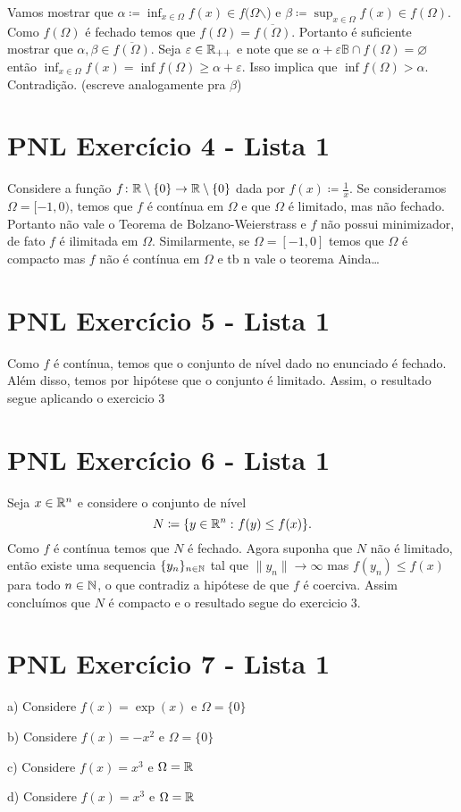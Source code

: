 \documentclass[12pt,twoside,a4paper]{book}
\begin{document}
Vamos mostrar que \(\alpha\coloneqq\inf_{x\in\Omega}f(x)\in f(\Omega\)$\backslash$) e \(\beta\coloneqq\sup_{x\in\Omega}f(x)\in f(\Omega)\).
Como \(f(\Omega)\) é fechado temos que \(f(\Omega)=\overline{f(\Omega)}\). Portanto é suficiente mostrar que 
\(\alpha,\beta\in\overline{f(\Omega)}\). Seja \(\varepsilon\in\mathbb{R}_{++}\) e note que se \(\alpha +\varepsilon\mathbb{B}\cap f(\Omega)=\varnothing\) então \(\inf_{x\in\Omega}f(x)=\inf f(\Omega)\geq\alpha+\varepsilon\).
Isso implica que \(\inf f(\Omega) > \alpha\). Contradição. (escreve analogamente pra \(\beta\))


\section{PNL Exercício 4 - Lista 1}
\label{sec:org026ff9d}

Considere a função \(f\colon\mathbb{R}\setminus\{0\}\to\mathbb{R}\setminus\{0\}\) dada por \(f(x)\coloneqq\frac{1}{x}\). Se consideramos
\(\Omega=[-1,0)\), temos que \(f\) é contínua em \(\Omega\) e que \(\Omega\) é limitado, mas não fechado.
Portanto não vale o Teorema de Bolzano-Weierstrass e \(f\) não possui minimizador, de fato \(f\) é ilimitada em \(\Omega\).
Similarmente, se \(\Omega=[-1,0]\) temos que \(\Omega\) é compacto mas \(f\) não é contínua em \(\Omega\) e tb n vale o teorema
Ainda\ldots{}

\section{PNL Exercício 5 - Lista 1}
\label{sec:org5714b88}

Como \(f\) é contínua, temos que o conjunto de nível dado no enunciado é fechado. Além disso, temos
por hipótese que o conjunto é limitado. Assim, o resultado segue aplicando o exercicio 3

\section{PNL Exercício 6 - Lista 1}
\label{sec:orga03c240}

Seja \(x\in\mathbb{R}^n\) e considere o conjunto de nível \[N\coloneqq\{y\in\mathbb{R}^n\,\colon f(y)\leq f(x)\}.\]
Como \(f\) é contínua temos que \(N\) é fechado. Agora suponha que \(N\) não é limitado,
então existe uma sequencia \(\{y_n\}_{n\in\mathbb{N}}\) tal que \(\|y_n\|\rightarrow\infty\) mas \(f(y_n)\leq f(x)\) para
todo \(n\in\mathbb{N}\), o que contradiz a hipótese de que \(f\) é coerciva. Assim concluímos que \(N\) é compacto e o resultado 
segue do exercicio 3.

\section{PNL Exercício 7 - Lista 1}
\label{sec:org290910a}
a) Considere \(f(x)=\exp(x)\) e \(\Omega=\{0\}\)

b) Considere \(f(x)=-x^2\) e \(\Omega=\{0\}\)

c) Considere \(f(x)=x^3\) e \(\Omega=\mathbb{R}\)

d) Considere \(f(x)=x^3\) e \(\Omega=\mathbb{R}\)
\end{document}
